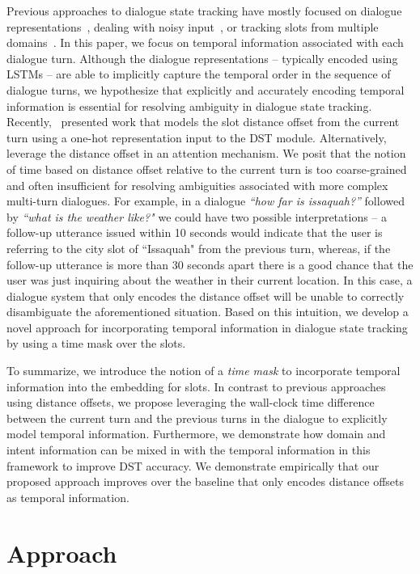 \documentclass[11pt,a4paper]{article}
\begin{document}
Previous approaches to dialogue state tracking have mostly focused on dialogue representations~\citep{mrkvsic2016neural}, dealing with noisy input~\citep{henderson2012discriminative, mesnil2015using}, or tracking slots from multiple domains~\citep{henderson2014word, rastogi2017scalable, cc-inter}.
In this paper, we focus on temporal information associated with each dialogue turn.
Although the dialogue representations -- typically encoded using LSTMs -- are able to implicitly capture the temporal order in the sequence of dialogue turns, we hypothesize that explicitly and accurately encoding temporal information is essential for resolving ambiguity in dialogue state tracking.
Recently,~\citep{cc-inter} presented work that models  the slot distance offset from the current turn using a one-hot representation input to the DST module.
Alternatively, ~\citep{su2018time} leverage the distance offset in an attention mechanism.
We posit that the notion of time based on distance offset relative to the current turn is too coarse-grained and often insufficient for resolving ambiguities associated with more complex multi-turn dialogues.
For example, in a dialogue \textit{``how far is issaquah?''} followed by \textit{``what is the weather like?"} we could have two possible interpretations -- a follow-up utterance issued within 10  seconds would indicate that the user is referring to the city slot of ``Issaquah" from the previous turn, whereas, if the follow-up utterance is more than 30 seconds apart there is a good chance that the user was just inquiring about the weather in their current location.
In this case, a dialogue system that only encodes the distance offset will be unable to correctly disambiguate the aforementioned situation.
Based on this intuition, we develop a novel approach for incorporating temporal information in dialogue state tracking by using a time mask over the slots. 

To summarize, we introduce the notion of a \textit{time mask} to incorporate temporal information into the embedding for slots.
In contrast to previous approaches using distance offsets, we propose leveraging the wall-clock time difference between the current turn and the previous turns in the dialogue to explicitly model temporal information.
Furthermore, we demonstrate how domain and intent information can be mixed in with the temporal information in this framework to improve DST accuracy.
We demonstrate empirically that our proposed approach improves over the baseline that only encodes distance offsets as temporal information. 
\section{Approach}
\label{sec:approach}
\end{document}
